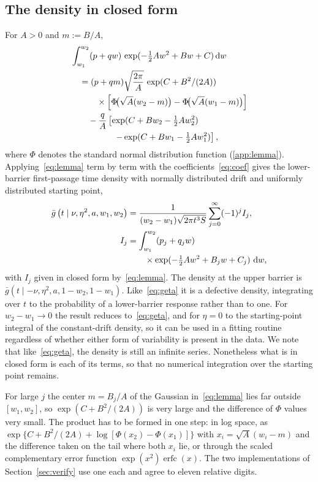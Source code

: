\documentclass[final,5p,times,twocolumn,authoryear]{elsarticle}
\newcommand{\dd}{\,\mathrm{d}}
\newcommand{\gbar}{\bar{g}}
\begin{document}
\subsection{The density in closed form}

For $A > 0$ and $m := B/A$,
\begin{align}
&\int_{w_1}^{w_2} (p + q w)\, \exp(-\tfrac12 A w^2 + B w + C) \dd w \notag\\
 &\quad = (p + q m)\sqrt{\frac{2\pi}{A}}\, \exp(C + B^2/(2A)) \notag\\
 &\qquad\quad\times \left[\Phi\!\big(\sqrt{A}(w_2 - m)\big) - \Phi\!\big(\sqrt{A}(w_1 - m)\big)\right] \notag\\
 &\qquad - \frac{q}{A}\left[\exp(C + B w_2 - \tfrac12 A w_2^2) \right. \notag\\
 &\qquad\qquad\quad \left. - \exp(C + B w_1 - \tfrac12 A w_1^2)\right],
\label{eq:lemma}
\end{align}
where $\Phi$ denotes the standard normal distribution function (\ref{app:lemma}). Applying~\eqref{eq:lemma} term by term with the coefficients~\eqref{eq:coef} gives the lower-barrier first-passage time density with normally distributed drift and uniformly distributed starting point,
\begin{align}
\gbar\left(t \mid \nu, \eta^2, a, w_1, w_2\right)
 &= \frac{1}{(w_2 - w_1)\sqrt{2\pi t^3 S}}\sum_{j=0}^{\infty} (-1)^j I_j , \label{eq:result}\\
I_j &= \int_{w_1}^{w_2} (p_j + q_j w) \notag\\
    &\qquad\times \exp(-\tfrac12 A w^2 + B_j w + C_j)\, \dd w , \notag
\end{align}
with $I_j$ given in closed form by~\eqref{eq:lemma}. The density at the upper barrier is $\gbar(t \mid -\nu, \eta^2, a, 1 - w_2, 1 - w_1)$. Like~\eqref{eq:geta} it is a defective density, integrating over $t$ to the probability of a lower-barrier response rather than to one. For $w_2 - w_1 \to 0$ the result reduces to~\eqref{eq:geta}, and for $\eta = 0$ to the starting-point integral of the constant-drift density, so it can be used in a fitting routine regardless of whether either form of variability is present in the data. We note that like~\eqref{eq:geta}, the density is still an infinite series. Nonetheless what is in closed form is each of its terms, so that no numerical integration over the starting point remains.

For large $j$ the center $m = B_j/A$ of the Gaussian in~\eqref{eq:lemma} lies far outside $[w_1, w_2]$, so $\exp(C + B^2/(2A))$ is very large and the difference of $\Phi$ values very small. The product has to be formed in one step: in log space, as $\exp\{C + B^2/(2A) + \log[\Phi(x_2) - \Phi(x_1)]\}$ with $x_i = \sqrt A(w_i - m)$ and the difference taken on the tail where both $x_i$ lie, or through the scaled complementary error function $\exp(x^2)\operatorname{erfc}(x)$. The two implementations of Section~\ref{sec:verify} use one each and agree to eleven relative digits.
\end{document}
